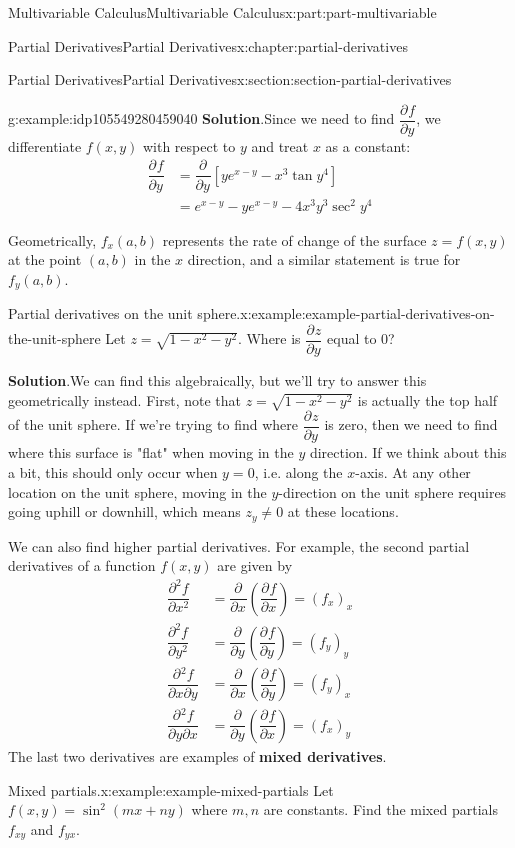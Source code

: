 \documentclass[twoside,10pt,]{book}
\newcommand{\blocktitlefont}{\relax}
\newcommand{\terminology}[1]{\textbf{#1}}
\numberwithin{equation}{part}
\newcommand{\pdv}[3][]{\dfrac{\partial^{#1} #2}{\partial #3^{#1}}}
\begin{document}
\begin{partptx}{Multivariable Calculus}{}{Multivariable Calculus}{}{}{x:part:part-multivariable}
\begin{chapterptx}{Partial Derivatives}{}{Partial Derivatives}{}{}{x:chapter:partial-derivatives}
\begin{sectionptx}{Partial Derivatives}{}{Partial Derivatives}{}{}{x:section:section-partial-derivatives}
\begin{example}{}{g:example:idp105549280459040}
\noindent\textbf{\blocktitlefont Solution}.\hypertarget{g:solution:idp105549280460320}{}\quad{}Since we need to find \(\pdv{f}{y}\), we differentiate \(f(x,y)\) with respect to \(y\) and treat \(x\) as a constant:%
\begin{align*}
\pdv{f}{y} & = \pdv{}{y}\left[ye^{x-y} - x^{3}\tan y^{4}\right] \\
& = e^{x-y} - ye^{x-y} - 4x^{3}y^{3}\sec^{2}y^{4} 
\end{align*}
%
\end{example}
Geometrically, \(f_{x}(a,b)\) represents the rate of change of the surface \(z = f(x,y)\) at the point \((a,b)\) in the \(x\) direction, and a similar statement is true for \(f_{y}(a,b)\).%
\begin{example}{Partial derivatives on the unit sphere.}{x:example:example-partial-derivatives-on-the-unit-sphere}%
Let \(z = \sqrt{1-x^{2} - y^{2}}\). Where is \(\pdv{z}{y}\) equal to \(0\)?%
\par\smallskip%
\noindent\textbf{\blocktitlefont Solution}.\hypertarget{g:solution:idp105549280467232}{}\quad{}We can find this algebraically, but we'll try to answer this geometrically instead. First, note that \(z = \sqrt{1 - x^{2} - y^{2}}\) is actually the top half of the unit sphere. If we're trying to find where \(\pdv{z}{y}\) is zero, then we need to find where this surface is "flat" when moving in the \(y\) direction. If we think about this a bit, this should only occur when \(y=0\), i.e. along the \(x\)-axis. At any other location on the unit sphere, moving in the \(y\)-direction on the unit sphere requires going uphill or downhill, which means \(z_{y}\neq0\) at these locations.%
\end{example}
We can also find higher partial derivatives. For example, the second partial derivatives of a function \(f(x,y)\) are given by%
\begin{align*}
\pdv[2]{f}{x} & = \pdv{}{x}\left(\pdv{f}{x}\right) = (f_{x})_{x} \\
\pdv[2]{f}{y} & = \pdv{}{y}\left(\pdv{f}{y}\right) = (f_{y})_{y} \\
\pdv{{}^{2}f}{x\partial y} & = \pdv{}{x}\left(\pdv{f}{y}\right) = (f_{y})_{x} \\
\pdv{{}^{2}f}{y\partial x} & = \pdv{}{y}\left(\pdv{f}{x}\right) = (f_{x})_{y} 
\end{align*}
The last two derivatives are examples of \terminology{mixed derivatives}.%
\begin{example}{Mixed partials.}{x:example:example-mixed-partials}%
Let \(f(x,y) = \sin^{2}(mx+ny)\) where \(m,n\) are constants. Find the mixed partials \(f_{xy}\) and \(f_{yx}\).%

\end{example}
\end{sectionptx}
\end{chapterptx}
\end{partptx}
\end{document}
